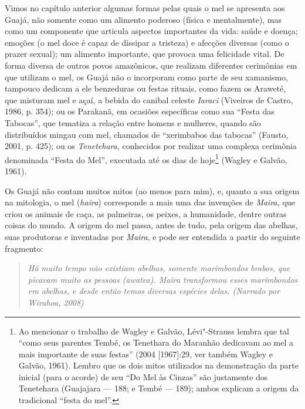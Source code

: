 Vimos no capítulo anterior algumas formas pelas quais o mel se apresenta
aos Guajá, não somente como um alimento poderoso (física e mentalmente),
mas como um componente que articula aspectos importantes da vida: saúde
e doença; emoções (o mel doce é capaz de dissipar a tristeza) e afecções
diversas (como o prazer sexual); um alimento importante, que provoca uma
felicidade vital. De forma diversa de outros povos amazônicos, que
realizam diferentes cerimônias em que utilizam o mel, os Guajá não o
incorporam como parte de seu xamanismo, tampouco dedicam a ele
benzeduras ou festas rituais, como fazem os Araweté, que misturam mel e
açaí, a bebida do canibal celeste \emph{Iaracĩ} (Viveiros de Castro,
1986, p. 354); ou os Parakanã, em ocasiões específicas como sua ``Festa
das Tabocas'', que tematiza a relação entre homens e mulheres, quando são
distribuídos mingau com mel, chamados de ``xerimbabos das tabocas''
(Fausto, 2001, p. 425); ou os \emph{Tenetehara}, conhecidos por realizar
uma complexa cerimônia denominada ``Festa do Mel'', executada até os dias
de hoje\footnote{Ao mencionar o trabalho de Wagley e Galvão,
  Lévi"-Strauss lembra que tal ``como seus parentes Tembé, os Tenethara do
  Maranhão dedicavam ao mel a mais importante de suas festas'' (2004
  {[}1967{]}:29, ver também Wagley e Galvão, 1961). Lembro que os dois
  mitos utilizados na demonstração da parte inicial (para o acorde) de
  seu ``Do Mel às Cinzas'' são justamente dos Tenetehara (Guajajara ---
  188; e Tembé --- 189); ambos explicam a origem da tradicional ``festa
  do mel''.} (Wagley e Galvão, 1961).

Os Guajá não contam muitos mitos (ao menos para mim), e, quanto a sua
origem na mitologia, o mel (\emph{haira}) corresponde a mais uma das
invenções de \emph{Maira,} que criou os animais de caça, as palmeiras,
os peixes, a humanidade, dentre outras coisas do mundo. A origem do mel
passa, antes de tudo, pela origem das abelhas, suas produtoras e
inventadas por \emph{Maira}, e pode ser entendida a partir do seguinte
fragmento:

\begin{quote}
\emph{Há muito tempo não existiam abelhas, somente marimbondos \emph{brabos},
que picavam muito as pessoas (\emph{awatea}). \emph{Maira} transformou
esses marimbondos em abelhas, e desde então temos diversas espécies
delas. (Narrado por Wirahoa, 2008)}
\end{quote}

